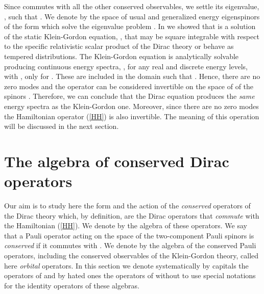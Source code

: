 \documentclass[a4paper,12pt]{article}
\begin{document}
 
Since \coordHE{} commutes with all the other conserved observables, we settle
its eigenvalue, \coordHE{},  such that \coordHE{} \cite{GM,GRFH}. 
We denote  by \myHighlight{$\Eh$}\coordHE{} the space of usual and generalized energy eigenspinors 
of the form  \coordHE{} which solve the 
eigenvalue problem \coordHE{} \cite{CV2}. In \cite{CV2,CV4} we showed 
that \coordHE{} is a solution of the static Klein-Gordon equation, 
\coordHE{},  that may be square integrable with respect to 
the specific relativistic scalar product of the Dirac theory \cite{CV2} or 
behave as tempered distributions. The Klein-Gordon equation is analytically 
solvable producing continuous energy spectra,  \coordHE{}, 
for any real \myHighlight{$\mu$}\coordHE{} and discrete energy levels, \coordHE{} with \coordHE{}, 
only for \coordHE{}. These are included in the domain \coordHE{} such that 
\coordHE{}. Hence,  there are no zero modes 
and the operator \myHighlight{$\Delta$}\coordHE{} can be considered invertible on the space of  
of the spinors \coordHE{}.    
Therefore, we can conclude that the Dirac equation produces the {\em same} 
energy spectra as the Klein-Gordon one. Moreover, since there are no zero 
modes the Hamiltonian operator (\ref{HH}) is also invertible. The meaning 
of this operation will be discussed in the next section.  


\section{The algebra of conserved Dirac operators}   

Our aim is to study here  the form and the action of the {\em conserved} 
operators of the Dirac theory which, by definition, are the Dirac operators 
that {\em commute} with the Hamiltonian (\ref{HH}). We denote by  \coordHE{} 
the algebra of these operators. We say that a Pauli operator \coordHE{} acting 
on the space of the two-component Pauli spinors \coordHE{} is {\em conserved} 
if it commutes with \myHighlight{$\Delta$}\coordHE{}. We denote by \coordHE{} the algebra of the 
conserved Pauli operators, including the conserved observables of the  
Klein-Gordon theory, called here {\em orbital} operators. In this section we 
denote systematically by capitals the operators of \coordHE{} and by hated ones 
the operators of \coordHE{} without to use special notations for the identity 
operators of these algebras.
\end{document}
